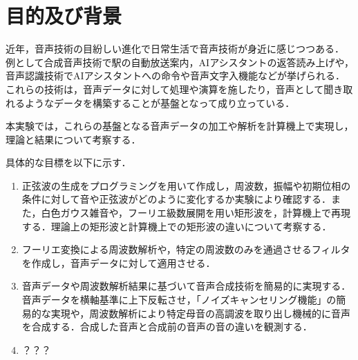 \chapter{目的及び背景}\label{chap:音の工学的特徴}
近年，音声技術の目紛しい進化で日常生活で音声技術が身近に感じつつある．
例として合成音声技術で駅の自動放送案内，AIアシスタントの返答読み上げや，音声認識技術でAIアシスタントへの命令や音声文字入機能などが挙げられる．
これらの技術は，音声データに対して処理や演算を施したり，音声として聞き取れるようなデータを構築することが基盤となって成り立っている．\par
本実験では，これらの基盤となる音声データの加工や解析を計算機上で実現し，理論と結果について考察する．\par
具体的な目標を以下に示す．
\begin{enumerate}
    \item 正弦波の生成をプログラミングを用いて作成し，周波数，振幅や初期位相の条件に対して音や正弦波がどのように変化するか実験により確認する．また，白色ガウス雑音や，フーリエ級数展開を用い矩形波を，計算機上で再現する．理論上の矩形波と計算機上での矩形波の違いについて考察する．
    \item フーリエ変換による周波数解析や，特定の周波数のみを通過させるフィルタを作成し，音声データに対して適用させる．
    \item 音声データや周波数解析結果に基づいて音声合成技術を簡易的に実現する．音声データを横軸基準に上下反転させ，「ノイズキャンセリング機能」の簡易的な実現や，周波数解析により特定母音の高調波を取り出し機械的に音声を合成する．合成した音声と合成前の音声の音の違いを観測する．
    \item ？？？
\end{enumerate}